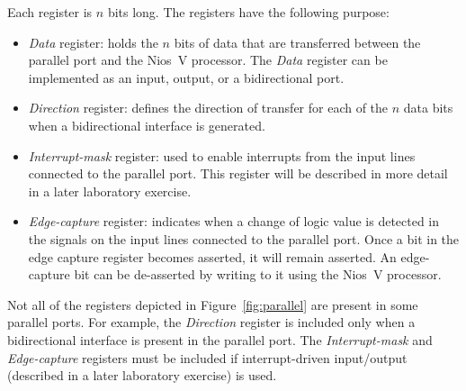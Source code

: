 \documentclass[epsfig,10pt,fullpage]{article}
\begin{document}
\noindent
Each register is $n$ bits long. The registers have the following purpose:
\begin{itemize}
\item {\it Data} register: holds the $n$ bits of data that are transferred between the parallel 
port and the Nios~V processor. The {\it Data} register can be implemented as an input, output,
or a bidirectional port.
\item {\it Direction} register: defines the direction of transfer for each of the $n$
data bits when a bidirectional interface is generated.
\item {\it Interrupt-mask} register: used to enable interrupts from the
input lines connected to the parallel port. This register will be described in more detail
in a later laboratory exercise. 
\item {\it Edge-capture} register: indicates when a change of logic value is detected in 
the signals on the input lines connected to the parallel port. Once a bit in the edge
capture register becomes asserted, it will remain asserted. An edge-capture bit can be
de-asserted by writing to it using the Nios~V processor.
\end{itemize}
\noindent
Not all of the registers depicted in Figure~\ref{fig:parallel} are present in some 
parallel ports. For example, the {\it Direction} register is included only when a 
bidirectional interface is present in the parallel port.
The {\it Interrupt-mask} and {\it Edge-capture} registers must be included if
interrupt-driven input/output (described in a later laboratory exercise) is used.
\end{document}
